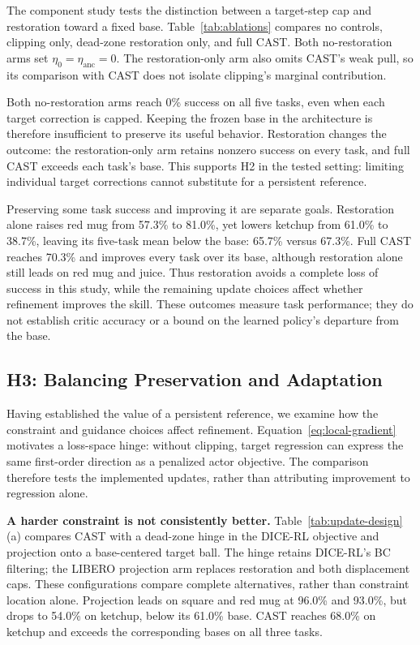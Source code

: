The component study tests the distinction between a target-step cap and
restoration toward a fixed base. Table~\ref{tab:ablations} compares no
controls, clipping only, dead-zone restoration only, and full CAST.
Both no-restoration arms set $\eta_0=\eta_{\mathrm{anc}}=0$.
The restoration-only arm also omits CAST's weak pull, so its comparison
with CAST does not isolate clipping's marginal contribution.

Both no-restoration arms reach 0\% success on all five tasks, even when
each target correction is capped. Keeping the frozen base in the
architecture is therefore insufficient to preserve its useful behavior.
Restoration changes the outcome: the restoration-only arm retains nonzero
success on every task, and full CAST exceeds each task's base. This
supports H2 in the tested setting: limiting individual target corrections
cannot substitute for a persistent reference.

Preserving some task success and improving it are separate goals.
Restoration alone raises red mug from 57.3\% to 81.0\%, yet lowers
ketchup from 61.0\% to 38.7\%, leaving its five-task mean below the base:
65.7\% versus 67.3\%. Full CAST reaches 70.3\% and improves every task
over its base, although restoration alone still leads on red mug and juice.
Thus restoration avoids a complete loss of success in this study, while
the remaining update choices affect whether refinement improves the skill.
These outcomes measure task performance; they do not establish critic
accuracy or a bound on the learned policy's departure from the base.

\subsection{H3: Balancing Preservation and Adaptation}
\label{sec:exp-design}


Having established the value of a persistent reference, we examine how
the constraint and guidance choices affect refinement.
Equation~\ref{eq:local-gradient} motivates a loss-space hinge: without
clipping, target regression can express the same first-order direction as
a penalized actor objective. The comparison therefore tests the implemented
updates, rather than attributing improvement to regression alone.

\textbf{A harder constraint is not consistently better.}
Table~\ref{tab:update-design}(a) compares CAST with a dead-zone hinge in
the DICE-RL objective and projection onto a base-centered target ball.
The hinge retains DICE-RL's BC filtering; the LIBERO projection arm
replaces restoration and both displacement caps. These configurations
compare complete alternatives, rather than constraint location alone.
Projection leads on square and red mug at 96.0\% and 93.0\%, but drops
to 54.0\% on ketchup, below its 61.0\% base. CAST reaches 68.0\% on
ketchup and exceeds the corresponding bases on all three tasks.

